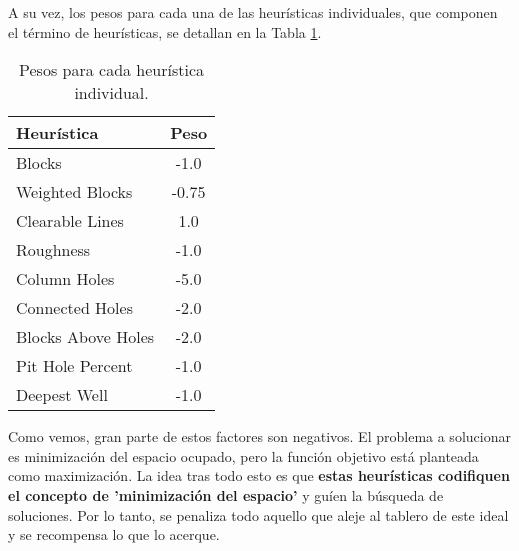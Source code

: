 \documentclass[11pt,spanish,listoffigures,listoftables]{tfgetsinf}
\begin{document}
A su vez, los pesos para cada una de las heurísticas individuales, que componen el término de heurísticas, se detallan en la Tabla \ref{tab:pesos_heuristicas}.

\begin{table}[H]
    \centering
    \caption{Pesos para cada heurística individual.}
    \label{tab:pesos_heuristicas}
    \begin{tabular}{lc}
        \toprule
        \textbf{Heurística} & \textbf{Peso} \\
        \midrule
        Blocks & -1.0 \\
        Weighted Blocks & -0.75 \\
        Clearable Lines & 1.0 \\
        Roughness & -1.0 \\
        Column Holes & -5.0 \\
        Connected Holes & -2.0 \\
        Blocks Above Holes & -2.0 \\
        Pit Hole Percent & -1.0 \\
        Deepest Well & -1.0 \\
        \bottomrule
    \end{tabular}
\end{table}

Como vemos, gran parte de estos factores son negativos. El problema a solucionar es minimización del espacio ocupado, pero la función objetivo está planteada como maximización. La idea tras todo esto es que \textbf{estas heurísticas codifiquen el concepto de 'minimización del espacio'} y guíen la búsqueda de soluciones. Por lo tanto, se penaliza todo aquello que aleje al tablero de este ideal y se recompensa lo que lo acerque.
\end{document}
